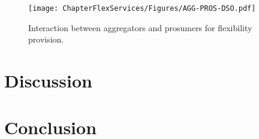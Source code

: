 \begin{figure}[htbp]
	\centering
	\texttt{[image: ChapterFlexServices/Figures/AGG-PROS-DSO.pdf]}
		\caption{Interaction between aggregators and prosumers for flexibility provision.}
	\label{fig:agg-pros-dso}  
\end{figure}

\section{Discussion}
\section{Conclusion}

	


